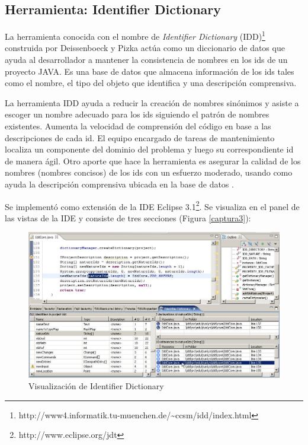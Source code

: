 \documentclass[a4paper,12pt]{report}
\begin{document}
\subsection{Herramienta: Identifier Dictionary}

La herramienta conocida con el nombre de \textit{Identifier Dictionary} (IDD)\footnote[1]{http://www4.informatik.tu-muenchen.de/\~{}ccsm/idd/index.html} construida por Deissenboeck y Pizka \cite{DFPM05} actúa como un diccionario de datos que ayuda al desarrollador a mantener la consistencia de nombres en los ids de un proyecto JAVA. Es una base de datos que almacena información de los ids tales como el nombre, el tipo del objeto que identifica y una descripción comprensiva.

La herramienta IDD ayuda a reducir la creación de nombres sinónimos y asiste a escoger un nombre adecuado para los ids siguiendo el patrón de nombres existentes. Aumenta la velocidad de comprensión del código en base a las descripciones de cada id. El equipo encargado de tareas de mantenimiento localiza un componente del dominio del problema y luego su correspondiente id de manera ágil. Otro aporte que hace la herramienta es asegurar la calidad de los nombres (nombres concisos) de los ids con un esfuerzo moderado, usando como ayuda la descripción comprensiva ubicada en la base de datos \cite{DFPM05,LFBEX07}.

Se implementó como extensión de la IDE Eclipse 3.1\footnote[2]{http://www.eclipse.org/jdt}. Se visualiza en el panel de las vistas de la IDE y consiste de tres secciones (Figura \ref{captura3}):

\begin{figure}[t] %
\centerline{%
\includegraphics[scale= 0.50]{./idd_3.png}
}
\caption{Visualización de Identifier Dictionary}
\label{captura4}
\end{figure} 
\end{document}
